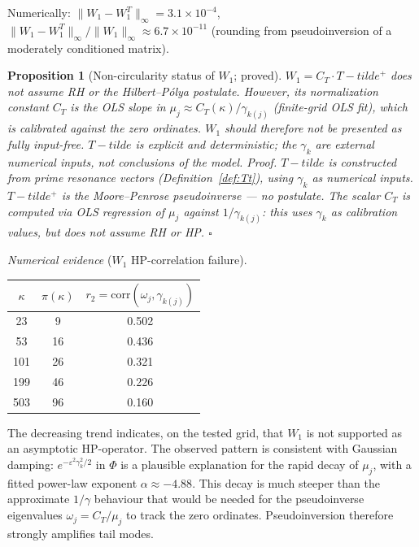\documentclass[11pt]{article}
\def\Tt{T-tilde}%
\newtheorem{proposition}[theorem]{Proposition}
\newcommand{\Tt}{\widetilde{T}}
\newcommand{\CT}{C_{T}}
\newcommand{\Wone}{W_1}
\begin{document}
Numerically: $\|\Wone - \Wone^T\|_\infty = 3.1\times 10^{-4}$,
$\|\Wone - \Wone^T\|_\infty/\|\Wone\|_\infty \approx 6.7\times 10^{-11}$
(rounding from pseudoinversion of a moderately conditioned matrix).

\begin{proposition}[Non-circularity status of $\Wone$; proved]\label{prop:W1-circ}
	$\Wone = \CT\cdot\Tt^+$ does not assume RH or the Hilbert--P\'olya postulate.
	However, its normalization constant $\CT$ is the OLS slope in
	$\mu_j\approx\CT(\kappa)/\gamma_{k(j)}$ (finite-grid OLS fit),
	which is calibrated against the zero ordinates.
	$\Wone$ should therefore not be presented as fully input-free.
	$\Tt$ is explicit and deterministic; the $\gamma_k$ are external
	numerical inputs, not conclusions of the model.
	\emph{Proof.}
	$\Tt$ is constructed from prime resonance vectors
	(Definition~\ref{def:Tt}), using $\gamma_k$ as numerical inputs.
	$\Tt^+$ is the Moore--Penrose pseudoinverse --- no postulate.
	The scalar $\CT$ is computed via OLS regression of $\mu_j$ against
	$1/\gamma_{k(j)}$: this uses $\gamma_k$ as calibration values, but
	does not assume RH or HP. $\square$
\end{proposition}

\emph{Numerical evidence} ($\Wone$ HP-correlation failure).

\begin{center}
\begin{tabular}{ccc}
\toprule
$\kappa$ & $\pi(\kappa)$ & $r_2 = \mathrm{corr}(\omega_j,\gamma_{k(j)})$ \\
\midrule
23  & 9  & 0.502 \\
53  & 16 & 0.436 \\
101 & 26 & 0.321 \\
199 & 46 & 0.226 \\
503 & 96 & 0.160 \\
\bottomrule
\end{tabular}
\end{center}

The decreasing trend indicates, on the tested grid,
that $\Wone$ is not supported as an asymptotic
HP-operator.
The observed pattern is consistent with Gaussian damping:
$e^{-\varepsilon^2\gamma_k^2/2}$ in $\Phi$ is a plausible explanation
for the rapid decay of $\mu_j$, with a fitted
power-law exponent $\alpha\approx -4.88$.
This decay is much steeper than the approximate $1/\gamma$ behaviour
that would be needed for the pseudoinverse eigenvalues
$\omega_j=\CT/\mu_j$ to track the zero ordinates.
Pseudoinversion therefore strongly amplifies tail modes.
\end{document}
